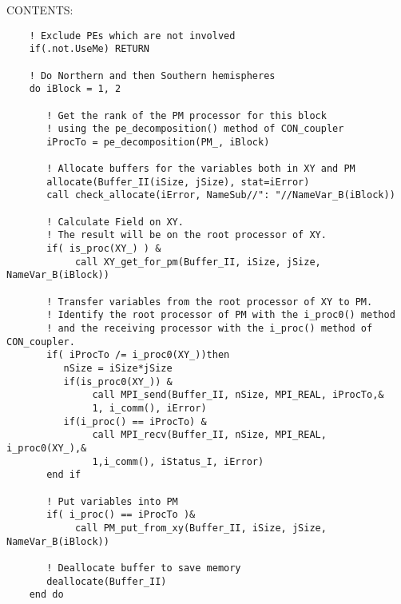 \bigskip
{\sf CONTENTS:}
\begin{verbatim}
    ! Exclude PEs which are not involved
    if(.not.UseMe) RETURN

    ! Do Northern and then Southern hemispheres
    do iBlock = 1, 2

       ! Get the rank of the PM processor for this block
       ! using the pe_decomposition() method of CON_coupler
       iProcTo = pe_decomposition(PM_, iBlock)

       ! Allocate buffers for the variables both in XY and PM
       allocate(Buffer_II(iSize, jSize), stat=iError)
       call check_allocate(iError, NameSub//": "//NameVar_B(iBlock))

       ! Calculate Field on XY.
       ! The result will be on the root processor of XY.
       if( is_proc(XY_) ) &
            call XY_get_for_pm(Buffer_II, iSize, jSize, NameVar_B(iBlock))

       ! Transfer variables from the root processor of XY to PM.
       ! Identify the root processor of PM with the i_proc0() method
       ! and the receiving processor with the i_proc() method of CON_coupler.
       if( iProcTo /= i_proc0(XY_))then
          nSize = iSize*jSize
          if(is_proc0(XY_)) &
               call MPI_send(Buffer_II, nSize, MPI_REAL, iProcTo,&
               1, i_comm(), iError)
          if(i_proc() == iProcTo) &
               call MPI_recv(Buffer_II, nSize, MPI_REAL, i_proc0(XY_),&
               1,i_comm(), iStatus_I, iError)
       end if

       ! Put variables into PM
       if( i_proc() == iProcTo )&
            call PM_put_from_xy(Buffer_II, iSize, jSize, NameVar_B(iBlock))

       ! Deallocate buffer to save memory
       deallocate(Buffer_II)
    end do

 
\end{verbatim}

